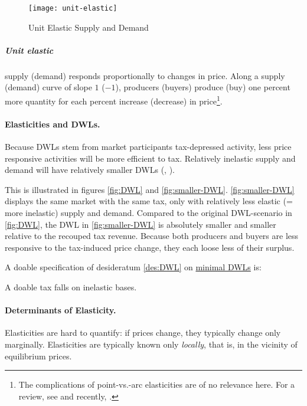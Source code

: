  \begin{figure}[htbp]
	\centering
	\texttt{[image: unit-elastic]}
	\caption{Unit Elastic Supply and Demand}
	\label{fig:UnitElastic}
\end{figure}

\subparagraph{Unit elastic}
supply (demand) responds proportionally to changes in price.
Along a supply (demand) curve of slope $1$ ($-1$), producers (buyers) produce (buy) one percent more quantity for each percent increase (decrease) in price\footnote{The complications of point-vs.-arc elasticities are of no relevance here.
For a review, see \cite{Allen1933} and recently, \cite{Vaughan1988}.}.

\paragraph{Elasticities and DWLs.}
Because DWLs stem from market participants tax-depressed activity, less price responsive activities will be more efficient to tax.
Relatively inelastic supply and demand will have relatively smaller DWLs (\citealt{Ramsey}, \citealt[16]{Piatkowski2008}).


This is illustrated in figures \ref{fig:DWL} and \ref{fig:smaller-DWL}.
\autoref{fig:smaller-DWL} displays the same market with the same tax, only with relatively less elastic (= more inelastic) supply and demand.
Compared to the original DWL-scenario in \autoref{fig:DWL}, the DWL in \autoref{fig:smaller-DWL} is absolutely smaller and smaller relative to the recouped tax revenue.
Because both producers and buyers are less responsive to the tax-induced price change, they each loose less of their surplus.

A doable specification of desideratum \ref{des:DWL} on \href{des:DWL}{minimal DWLs} is:

\begin{desideratum}
	A doable tax falls on inelastic bases.
	\label{des:tax-inelastic}
\end{desideratum}

\paragraph{Determinants of Elasticity.}
Elasticities are hard to quantify:
if prices change, they typically change only marginally.
Elasticities are typically known only \emph{locally}, that is, in the vicinity of equilibrium prices.

